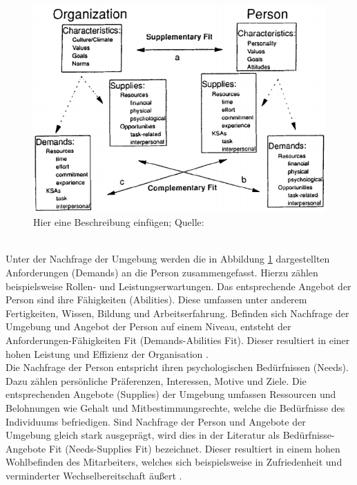 \begin{figure}[h]
	\centering
	\includegraphics[width=1\textwidth]{gfx/supplementaryComplementaryFit.png}
	\caption{Hier eine Beschreibung einfügen; Quelle: \cite[S. 4]{kristof:1996}}
	\label{fig:personEnvironmentFit:supplementaryUndComplementary:abb1}
\end{figure}
\\
Unter der Nachfrage der Umgebung werden die in Abbildung \ref{fig:personEnvironmentFit:supplementaryUndComplementary:abb1} dargestellten Anforderungen (Demands) an die Person zusammengefasst. Hierzu zählen beispielsweise Rollen- und Leistungserwartungen. Das entsprechende Angebot der Person sind ihre Fähigkeiten (Abilities). Diese umfassen unter anderem Fertigkeiten, Wissen, Bildung und Arbeitserfahrung. Befinden sich Nachfrage der Umgebung und Angebot der Person auf einem Niveau, entsteht der Anforderungen-Fähigkeiten Fit (Demands-Abilities Fit). Dieser resultiert in einer hohen Leistung und Effizienz der Organisation \cite[S. 3f.]{edwards:1991}\cite[S. 5]{edwards:1996}\cite[S. 4f.]{edwards:2007}\cite[S. 6]{su:2015}.\\
Die Nachfrage der Person entspricht ihren psychologischen Bedürfnissen (Needs). Dazu zählen persönliche Präferenzen, Interessen, Motive und Ziele. Die entsprechenden Angebote (Supplies) der Umgebung umfassen Ressourcen und Belohnungen wie Gehalt und Mitbestimmungsrechte, welche die Bedürfnisse des Individuums befriedigen. Sind Nachfrage der Person und Angebote der Umgebung gleich stark ausgeprägt, wird dies in der Literatur als Bedürfnisse-Angebote Fit (Needs-Supplies Fit) bezeichnet. Dieser resultiert in einem hohen Wohlbefinden des Mitarbeiters, welches sich beispielsweise in Zufriedenheit und verminderter Wechselbereitschaft äußert \cite[S. 2]{edwards:2004}\cite[S. 2f.]{edwards:1996}\cite[S. 4]{edwards:2008}\cite[S. 4f.]{edwards:2007}\cite[S. 6]{su:2015}.\\
